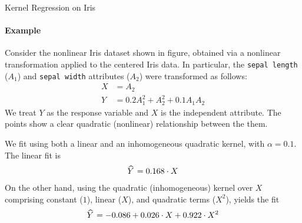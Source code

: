 %
%
%
\begin{frame}{Kernel Regression on Iris}
\framesubtitle{Example}
    Consider the nonlinear Iris dataset shown in figure,
obtained via a nonlinear
    transformation applied to the centered Iris data. In particular, the
    {\tt sepal length} ($A_1$) and {\tt sepal width} attributes ($A_2$)
    were transformed as follows:
    \begin{align*}
        X &= A_2\\
        Y &= 0.2A_1^2 + A_2^2 + 0.1A_1A_2
    \end{align*}
    We treat $Y$ as the response variable and $X$ is the independent
    attribute. The points show a clear quadratic (nonlinear)
    relationship between the them.

    We fit using both a linear and an
    inhomogeneous quadratic kernel, with 
    $\alpha=0.1$. The linear fit is
    \begin{align*}
        \mkern 1.5mu\widehat{\mkern-1.5muY}\mkern 1.5mu = 0.168\cdot X
    \end{align*}
    On the other hand, using the quadratic (inhomogeneous) kernel over
    $X$ comprising constant ($1$), linear ($X$), and quadratic terms ($X^2$), 
    yields
    the fit
    \begin{align*}
        \mkern 1.5mu\widehat{\mkern-1.5muY}\mkern 1.5mu = -0.086 + 0.026 \cdot X + 0.922 \cdot X^2
    \end{align*}
\end{frame}

